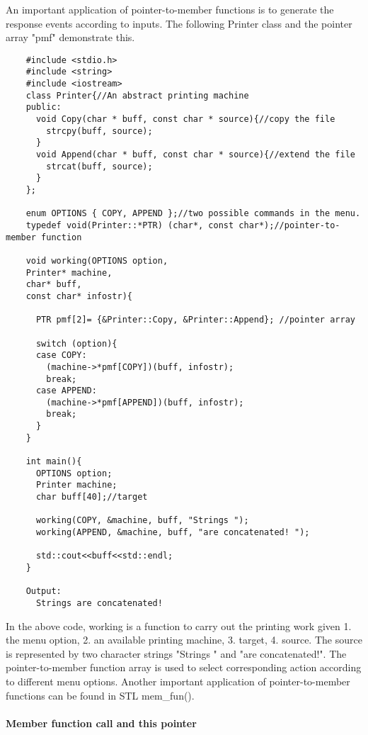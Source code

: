 \documentclass{book}
\begin{document}
An important application of pointer-to-member functions is to generate the response events according to inputs. The following Printer class and the pointer array "pmf" demonstrate this.

\begin{lstlisting}
    #include <stdio.h>
    #include <string>
    #include <iostream>
    class Printer{//An abstract printing machine
    public:
      void Copy(char * buff, const char * source){//copy the file
        strcpy(buff, source);
      }
      void Append(char * buff, const char * source){//extend the file
        strcat(buff, source);
      }
    };
     
    enum OPTIONS { COPY, APPEND };//two possible commands in the menu.
    typedef void(Printer::*PTR) (char*, const char*);//pointer-to-member function 
     
    void working(OPTIONS option,
    Printer* machine,
    char* buff,
    const char* infostr){
     
      PTR pmf[2]= {&Printer::Copy, &Printer::Append}; //pointer array 
     
      switch (option){
      case COPY:
        (machine->*pmf[COPY])(buff, infostr);
        break;
      case APPEND:
        (machine->*pmf[APPEND])(buff, infostr);
        break;
      }
    }
     
    int main(){
      OPTIONS option; 
      Printer machine;
      char buff[40];//target
     
      working(COPY, &machine, buff, "Strings ");  
      working(APPEND, &machine, buff, "are concatenated! ");
     
      std::cout<<buff<<std::endl;
    } 

    Output:
      Strings are concatenated! 
\end{lstlisting}
In the above code, working is a function to carry out the printing work given 
1. the menu option,
2. an available printing machine,
3. target,
4. source.
The source is represented by two character strings "Strings " and "are concatenated!".
The pointer-to-member function array is used to select corresponding action according to different menu options.
Another important application of pointer-to-member functions can be found in STL mem\_fun().

\paragraph{Member function call and this pointer}
\end{document}
